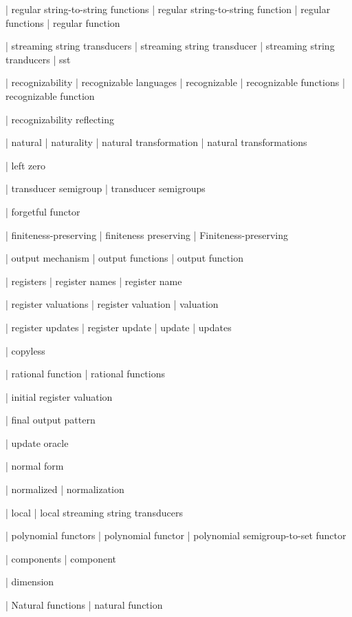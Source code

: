  | regular string-to-string functions
 | regular string-to-string function
 | regular functions
 | regular function

| streaming string transducers
 | streaming string transducer
| streaming string tranducers
| sst

| recognizability
| recognizable languages
| recognizable
| recognizable functions
| recognizable function

| recognizability reflecting

| natural
| naturality
| natural transformation
| natural transformations

| left zero

| transducer semigroup
| transducer semigroups

| forgetful functor

| finiteness-preserving
| finiteness preserving
| Finiteness-preserving

| output mechanism
| output functions
| output function

| registers
| register names
| register name

| register valuations
| register valuation
| valuation

| register updates
| register update
| update
| updates

| copyless

| rational function
| rational functions

| initial register valuation

| final output pattern

| update oracle

| normal form

| normalized
| normalization

| local
| local streaming string transducers

| polynomial functors
| polynomial functor
| polynomial semigroup-to-set functor

| components
| component

| dimension

| Natural functions
| natural function

